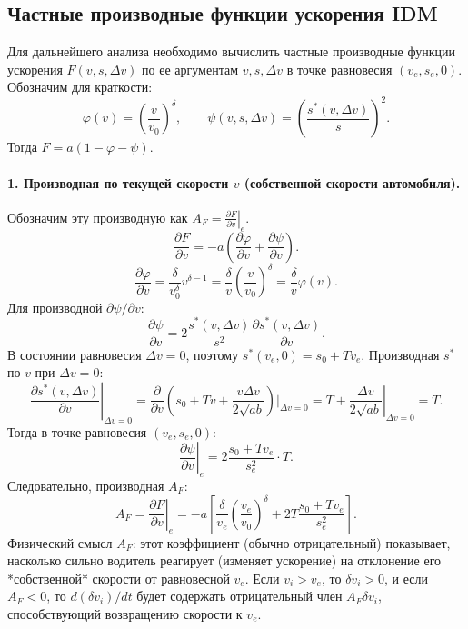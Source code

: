 \documentclass[12pt, a4paper]{article}
\begin{document}
\subsection{Частные производные функции ускорения IDM}
\label{subsec:partial_derivatives_idm}

Для дальнейшего анализа необходимо вычислить частные производные функции ускорения $F(v,s,\Delta v)$ по ее аргументам $v, s, \Delta v$ в точке равновесия $(v_e, s_e, 0)$.
Обозначим для краткости:
\[ \varphi(v) = \left(\frac{v}{v_0}\right)^{\delta}, \qquad \psi(v,s,\Delta v) = \left(\frac{s^*(v, \Delta v)}{s}\right)^{2}. \]
Тогда $F = a(1-\varphi-\psi)$.

\paragraph{1. Производная по текущей скорости $v$ (собственной скорости автомобиля).}
Обозначим эту производную как $A_F = \left.\frac{\partial F}{\partial v}\right|_e$.
\[ \frac{\partial F}{\partial v} = -a \left( \frac{\partial \varphi}{\partial v} + \frac{\partial \psi}{\partial v} \right). \]
\[ \frac{\partial \varphi}{\partial v} = \frac{\delta}{v_0^\delta} v^{\delta-1} = \frac{\delta}{v} \left(\frac{v}{v_0}\right)^{\delta} = \frac{\delta}{v} \varphi(v). \]
Для производной $\partial \psi / \partial v$:
\[ \frac{\partial \psi}{\partial v} = 2 \frac{s^*(v, \Delta v)}{s^2} \frac{\partial s^*(v, \Delta v)}{\partial v}. \]
В состоянии равновесия $\Delta v = 0$, поэтому $s^*(v_e, 0) = s_0 + T v_e$.
Производная $s^*$ по $v$ при $\Delta v = 0$:
\[ \left.\frac{\partial s^*(v, \Delta v)}{\partial v}\right|_{\Delta v=0} = \frac{\partial}{\partial v} \left(s_0 + T v + \frac{v \Delta v}{2 \sqrt{ab}}\right) \Bigg|_{\Delta v=0} = T + \left.\frac{\Delta v}{2 \sqrt{ab}}\right|_{\Delta v=0} = T. \]
Тогда в точке равновесия $(v_e, s_e, 0)$:
\[ \left.\frac{\partial \psi}{\partial v}\right|_e = 2 \frac{s_0 + T v_e}{s_e^2} \cdot T. \]
Следовательно, производная $A_F$:
\begin{equation}
\label{eq:df_dv_A}
A_F = \left.\frac{\partial F}{\partial v}\right|_e = -a \left[ \frac{\delta}{v_e} \left(\frac{v_e}{v_0}\right)^{\delta} + 2T \frac{s_0 + T v_e}{s_e^2} \right].
\end{equation}
Физический смысл $A_F$: этот коэффициент (обычно отрицательный) показывает, насколько сильно водитель реагирует (изменяет ускорение) на отклонение его *собственной* скорости от равновесной $v_e$. Если $v_i > v_e$, то $\delta v_i > 0$, и если $A_F < 0$, то $d(\delta v_i)/dt$ будет содержать отрицательный член $A_F \delta v_i$, способствующий возвращению скорости к $v_e$.
\end{document}
